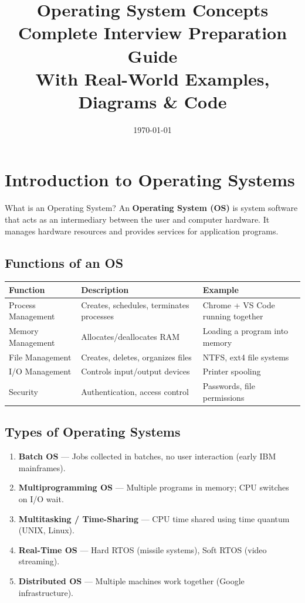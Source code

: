 \documentclass[12pt,a4paper]{article}
\title{
    \vspace{-1cm}
    {\Huge\textbf{Operating System Concepts}}\\[0.3cm]
    {\LARGE Complete Interview Preparation Guide}\\[0.3cm]
    {\large With Real-World Examples, Diagrams \& Code}
}
\author{}
\date{\today}
\begin{document}
\maketitle
\thispagestyle{fancy}

\tableofcontents
\newpage

\section{Introduction to Operating Systems}

\begin{conceptbox}{What is an Operating System?}
An \textbf{Operating System (OS)} is system software that acts as an intermediary between the user and computer hardware. It manages hardware resources and provides services for application programs.
\end{conceptbox}

\subsection{Functions of an OS}
\begin{center}
\begin{tabular}{@{} l p{6cm} p{4.5cm} @{}}
\toprule
\textbf{Function} & \textbf{Description} & \textbf{Example} \\
\midrule
Process Management & Creates, schedules, terminates processes & Chrome + VS Code running together \\
Memory Management & Allocates/deallocates RAM & Loading a program into memory \\
File Management & Creates, deletes, organizes files & NTFS, ext4 file systems \\
I/O Management & Controls input/output devices & Printer spooling \\
Security & Authentication, access control & Passwords, file permissions \\
\bottomrule
\end{tabular}
\end{center}

\subsection{Types of Operating Systems}
\begin{enumerate}[leftmargin=*]
    \item \textbf{Batch OS} --- Jobs collected in batches, no user interaction (early IBM mainframes).
    \item \textbf{Multiprogramming OS} --- Multiple programs in memory; CPU switches on I/O wait.
    \item \textbf{Multitasking / Time-Sharing} --- CPU time shared using time quantum (UNIX, Linux).
    \item \textbf{Real-Time OS} --- Hard RTOS (missile systems), Soft RTOS (video streaming).
    \item \textbf{Distributed OS} --- Multiple machines work together (Google infrastructure).
\end{enumerate}
\end{document}

